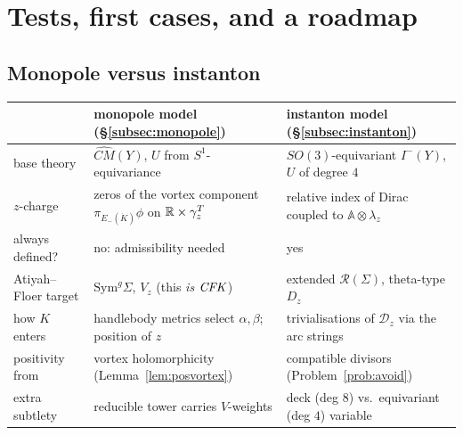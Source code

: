 \section{Tests, first cases, and a roadmap}\label{sec:tests}

\subsection{Monopole versus instanton}
\begin{center}\small
\begin{tabular}{p{3.3cm}p{5.2cm}p{5.2cm}}
\toprule
& monopole model (\S\ref{subsec:monopole}) & instanton model (\S\ref{subsec:instanton})\\
\midrule
base theory & $\widehat{CM}(Y)$, $U$ from $S^1$-equivariance & $SO(3)$-equivariant $I^-(Y)$, $U$ of degree $4$\\
$z$-charge & zeros of the vortex component $\pi_{E_-(\dot K)}\phi$ on $\mathbb{R}\times\gamma_z^T$ & relative index of Dirac coupled to $\mathbb A\otimes\lambda_z$\\
always defined? & no: admissibility needed & yes\\
Atiyah--Floer target & $\mathrm{Sym}^g\Sigma$, $V_z$ (this \emph{is} $\mathit{CFK}$) & extended $\mathcal R(\Sigma)$, theta-type $D_z$\\
how $K$ enters & handlebody metrics select $\alpha,\beta$; position of $z$ & trivialisations of $\mathcal D_z$ via the arc strings\\
positivity from & vortex holomorphicity (Lemma~\ref{lem:posvortex}) & compatible divisors (Problem~\ref{prob:avoid})\\
extra subtlety & reducible tower carries $V$-weights & deck (deg $8$) vs.\ equivariant (deg $4$) variable\\
\bottomrule
\end{tabular}
\end{center}

